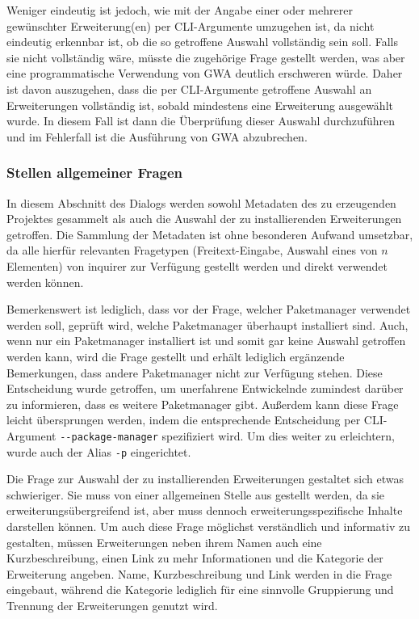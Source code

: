 Weniger eindeutig ist jedoch, wie mit der Angabe einer oder mehrerer gewünschter Erweiterung(en) per \gls{CLI}-Argumente umzugehen ist, da nicht eindeutig erkennbar ist, ob die so getroffene Auswahl vollständig sein soll. Falls sie nicht vollständig wäre, müsste die zugehörige Frage gestellt werden, was aber eine programmatische Verwendung von \gls{GWA} deutlich erschweren würde. Daher ist davon auszugehen, dass die per \gls{CLI}-Argumente getroffene Auswahl an Erweiterungen vollständig ist, sobald mindestens eine Erweiterung ausgewählt wurde. In diesem Fall ist dann die Überprüfung dieser Auswahl durchzuführen und im Fehlerfall ist die Ausführung von \gls{GWA} abzubrechen.

\subsubsection{Stellen allgemeiner Fragen}
\label{impl:general_questions}
In diesem Abschnitt des Dialogs werden sowohl Metadaten des zu erzeugenden Projektes gesammelt als auch die Auswahl der zu installierenden Erweiterungen getroffen. Die Sammlung der Metadaten ist ohne besonderen Aufwand umsetzbar, da alle hierfür relevanten Fragetypen (Freitext-Eingabe, Auswahl eines von $n$ Elementen) von inquirer zur Verfügung gestellt werden und direkt verwendet werden können.

Bemerkenswert ist lediglich, dass vor der Frage, welcher Paketmanager verwendet werden soll, geprüft wird, welche Paketmanager überhaupt installiert sind. Auch, wenn nur ein Paketmanager installiert ist und somit gar keine Auswahl getroffen werden kann, wird die Frage gestellt und erhält lediglich ergänzende Bemerkungen, dass andere Paketmanager nicht zur Verfügung stehen. Diese Entscheidung wurde getroffen, um unerfahrene Entwickelnde zumindest darüber zu informieren, dass es weitere Paketmanager gibt. Außerdem kann diese Frage leicht übersprungen werden, indem die entsprechende Entscheidung per \gls{CLI}-Argument \verb|--package-manager| spezifiziert wird. Um dies weiter zu erleichtern, wurde auch der Alias \verb|-p| eingerichtet.

Die Frage zur Auswahl der zu installierenden Erweiterungen gestaltet sich etwas schwieriger. Sie muss von einer allgemeinen Stelle aus gestellt werden, da sie erweiterungsübergreifend ist, aber muss dennoch erweiterungsspezifische Inhalte darstellen können. Um auch diese Frage möglichst verständlich und informativ zu gestalten, müssen Erweiterungen neben ihrem Namen auch eine Kurzbeschreibung, einen Link zu mehr Informationen und die Kategorie der Erweiterung angeben. Name, Kurzbeschreibung und Link werden in die Frage eingebaut, während die Kategorie lediglich für eine sinnvolle Gruppierung und Trennung der Erweiterungen genutzt wird.

